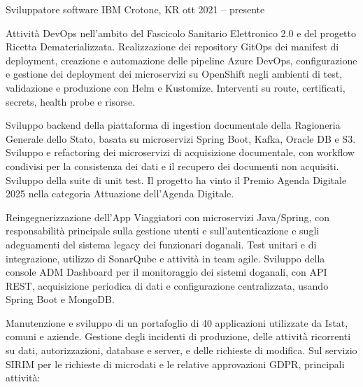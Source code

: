 \documentclass[]{style}
\begin{document}
\makecvheader


\begin{cventries}
	\cventry
	{Sviluppatore software}
	{IBM}
	{Crotone, KR}
	{ott 2021 -- presente}
	{\begin{cventryparagraph}
		\item {}
		\item {Attività DevOps nell'ambito del Fascicolo Sanitario Elettronico 2.0 e del progetto Ricetta Dematerializzata. Realizzazione dei repository GitOps dei manifest di deployment, creazione e automazione delle pipeline Azure DevOps, configurazione e gestione dei deployment dei microservizi su OpenShift negli ambienti di test, validazione e produzione con Helm e Kustomize. Interventi su route, certificati, secrets, health probe e risorse.}
		\item {}
		\item {Sviluppo backend della piattaforma di ingestion documentale della Ragioneria Generale dello Stato, basata su microservizi Spring Boot, Kafka, Oracle DB e S3. Sviluppo e refactoring dei microservizi di acquisizione documentale, con workflow condivisi per la consistenza dei dati e il recupero dei documenti non acquisiti. Sviluppo della suite di unit test. Il progetto ha vinto il Premio Agenda Digitale 2025 nella categoria Attuazione dell'Agenda Digitale.}
		\item {}
		\item {Reingegnerizzazione dell'App Viaggiatori con microservizi Java/Spring, con responsabilità principale sulla gestione utenti e sull'autenticazione e sugli adeguamenti del sistema legacy dei funzionari doganali. Test unitari e di integrazione, utilizzo di SonarQube e attività in team agile. Sviluppo della console ADM Dashboard per il monitoraggio dei sistemi doganali, con API REST, acquisizione periodica di dati e configurazione centralizzata, usando Spring Boot e MongoDB.}
		\item {}
		\item {Manutenzione e sviluppo di un portafoglio di 40 applicazioni utilizzate da Istat, comuni e aziende. Gestione degli incidenti di produzione, delle attività ricorrenti su dati, autorizzazioni, database e server, e delle richieste di modifica. Sul servizio SIRIM per le richieste di microdati e le relative approvazioni GDPR, principali attività:}

\end{cventryparagraph}}
\end{cventries}
\end{document}
